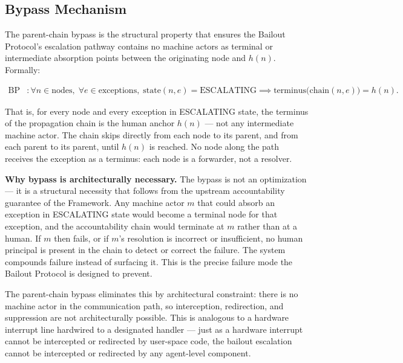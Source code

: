 \subsection{Bypass Mechanism}\label{sec:bypass}

The parent-chain bypass is the structural property that ensures the Bailout Protocol's escalation pathway contains no machine actors as terminal or intermediate absorption points between the originating node and $h(n)$. Formally:

\begin{align}
\text{BP} &: \forall n \in \text{nodes},\; \forall e \in \text{exceptions},\; \text{state}(n, e) = \text{ESCALATING} \implies \text{terminus}\bigl(\text{chain}(n, e)\bigr) = h(n). \tag{BP}
\end{align}

That is, for every node and every exception in ESCALATING state, the terminus of the propagation chain is the human anchor $h(n)$ — not any intermediate machine actor. The chain skips directly from each node to its parent, and from each parent to its parent, until $h(n)$ is reached. No node along the path receives the exception as a terminus: each node is a forwarder, not a resolver.

\bigskip
\noindent\textbf{Why bypass is architecturally necessary.} The bypass is not an optimization — it is a structural necessity that follows from the upstream accountability guarantee of the \bxthree{} Framework. Any machine actor $m$ that could absorb an exception in ESCALATING state would become a terminal node for that exception, and the accountability chain would terminate at $m$ rather than at a human. If $m$ then fails, or if $m$'s resolution is incorrect or insufficient, no human principal is present in the chain to detect or correct the failure. The system compounds failure instead of surfacing it. This is the precise failure mode the Bailout Protocol is designed to prevent.

The parent-chain bypass eliminates this by architectural constraint: there is no machine actor in the communication path, so interception, redirection, and suppression are not architecturally possible. This is analogous to a hardware interrupt line hardwired to a designated handler — just as a hardware interrupt cannot be intercepted or redirected by user-space code, the bailout escalation cannot be intercepted or redirected by any agent-level component.

